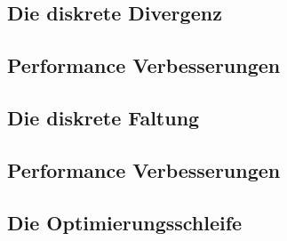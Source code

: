\documentclass{article}
\theoremstyle{case}
\begin{document}
\subsection{Die diskrete Divergenz}

\subsection*{Performance Verbesserungen}

\subsection{Die diskrete Faltung}

\subsection*{Performance Verbesserungen}

\subsection{Die Optimierungsschleife}



%
%
\end{document}
